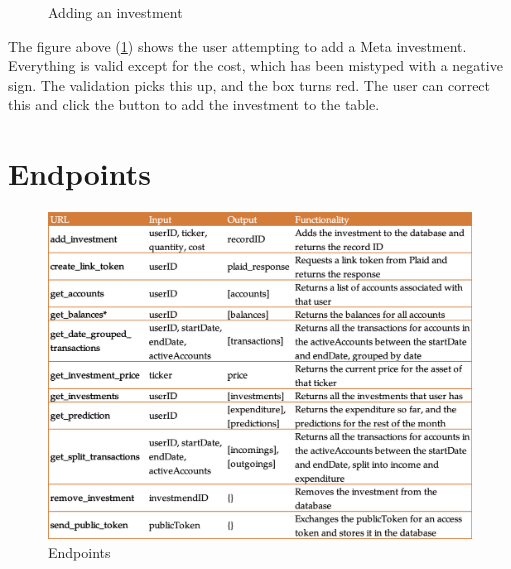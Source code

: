 \begin{figure}[H]
	\centering
	\caption{Adding an investment}
	\label{fig:InvestmentsError}
\end{figure}

The figure above (\ref{fig:InvestmentsError}) shows the user attempting to add a Meta investment. Everything is valid except for the cost, which has been mistyped with a negative sign. The validation picks this up, and the box turns red. The user can correct this and click the button to add the investment to the table.

\section{Endpoints}
\begin{figure}
	\centering
	\includegraphics[width=\textwidth]{images/endpoints.png}
	\caption{Endpoints}
	\label{fig:Endpoints}
\end{figure}
